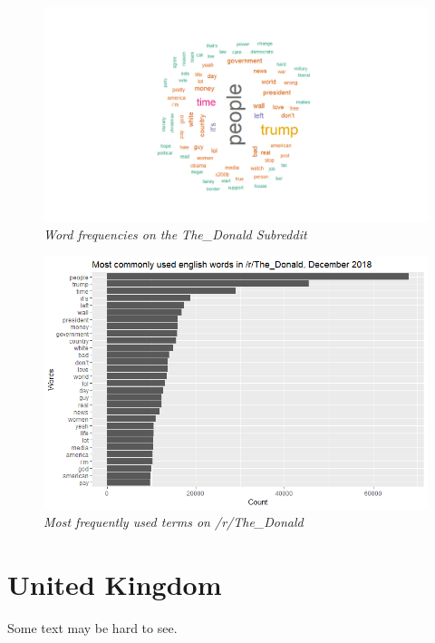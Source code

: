 \begin{figure}[ht]
    \centering
    \includegraphics[width=1.0\textwidth]{graphs/The_Donald/Wallcloud_the_donald.png}
    \caption{\textit{Word frequencies on the The_Donald Subreddit}}
    \label{fig:thedonald_cloud}
\end{figure}

\begin{figure}[H]
    \centering
    \includegraphics[width=1.0\textwidth]{graphs/The_Donald/WordFreq_TheDonald.png}
    \caption{\textit{Most frequently used terms on /r/The_Donald}}
    \label{fig:thedonald_wordfreq}
\end{figure}

\section{United Kingdom}
Some text may be hard to see.
\label{sec:uk}

